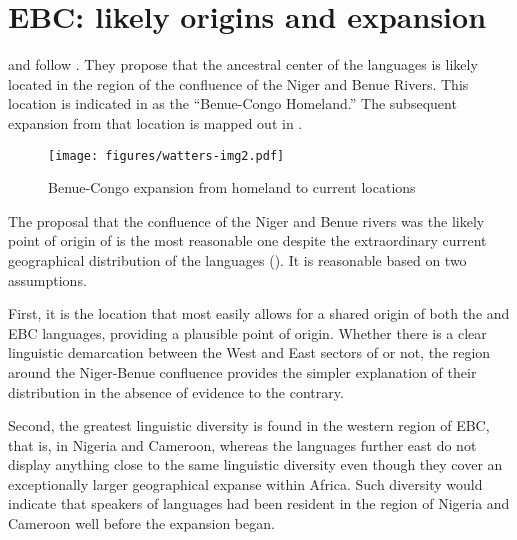 \documentclass[output=paper]{langsci/langscibook}
\begin{document}
\section{EBC: likely origins and expansion} \label{sec:watters:3}

\citet[269-272]{Williamson1989} and \citet[134]{Blench2006} follow \citet{Armstrong1981}. They propose that the ancestral center of the  languages is likely located in the region of the confluence of the Niger and Benue Rivers. This location is indicated in  as the “Benue-Congo Homeland.” The subsequent expansion from that location is mapped out in .

\begin{figure}
\caption{Benue-Congo expansion from homeland to current locations}
\label{fig:watters:3}
\texttt{[image: figures/watters-img2.pdf]}
\end{figure}

The proposal that the confluence of the Niger and Benue rivers was the likely point of origin of  is the most reasonable one despite the extraordinary current geographical distribution of the  languages ().  It is reasonable based on two assumptions.


First, it is the location that most easily allows for a shared origin of both the  and EBC languages, providing a plausible point of origin. Whether there is a clear linguistic demarcation between the West and East sectors of  or not, the region around the Niger-Benue confluence provides the simpler explanation of their distribution in the absence of evidence to the contrary. 

\newpage 
Second, the greatest linguistic diversity is found in the western region of EBC, that is, in Nigeria and Cameroon, whereas the  languages further east do not display anything close to the same linguistic diversity even though they cover an exceptionally larger geographical expanse within Africa. Such diversity would indicate that speakers of  languages had been resident in the region of Nigeria and Cameroon well before the  expansion began.

   
 
\end{document}
